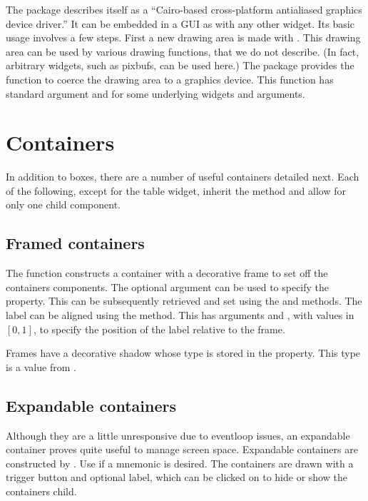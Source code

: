 The package  describes itself as a ``Cairo-based
cross-platform antialiased graphics device driver.''  It can be
embedded in a  GUI as with any other widget. Its basic
usage involves a few steps. First a new drawing area is made with
. This drawing area can be
used by various drawing functions, that we do not describe. (In fact,
arbitrary widgets, such as pixbufs, can be used here.) The
 package provides the function
 to coerce the drawing area to a graphics
device. This function has standard argument
 and for some underlying widgets
 and  arguments.

\section{Containers}
\label{sec:containers}


In addition to boxes, there are a number of useful containers detailed
next. Each of the following, except for the table widget, inherit the
 method and allow for only one child component.


\subsection{Framed containers}
\label{sec:RGtk2:gtkFrame}

The  function constructs a container with a
decorative frame to set off the containers components. The optional
 argument can be used to specify the
 property. This can be subsequently retrieved and set
using the  and 
methods. The label can be aligned using the
 method. This has arguments
 and , with values in $[0,1]$, to specify the position of the label
relative to the frame.

Frames have a decorative shadow whose type is stored in the
 property. This type is a value from .

\subsection{Expandable containers}
\label{sec:RGtk2:gtkExpander}

Although they are a little unresponsive due to eventloop issues, an
expandable container proves quite useful to manage screen space. Expandable containers are
constructed by . Use
 if a mnemonic is desired. The
containers are drawn with a trigger button and optional label, which can be
clicked on to hide or show the containers child.

